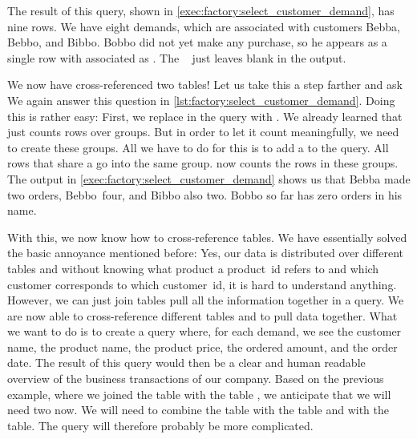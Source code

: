 The result of this query, shown in \cref{exec:factory:select_customer_demand}, has nine rows.
We have eight demands, which are associated with customers Bebba, Bebbo, and Bibbo.
Bobbo did not yet make any purchase, so he appears as a single row with  associated as .
The \psql\  just leaves  blank in the output.

We now have cross-referenced two tables!
Let us take this a step farther and ask 
We again answer this question in \cref{lst:factory:select_customer_demand}.
Doing this is rather easy:
First, we replace  in the query with .
We already learned that  just counts rows over groups.
But in order to let it count meaningfully, we need to create these groups.
All we have to do for this is to add a  to the query.
All rows that share a  go into the same group.
 now counts the rows in these groups.
The output in \cref{exec:factory:select_customer_demand} shows us that Bebba made two orders, Bebbo~four, and Bibbo also two.
Bobbo so far has zero orders in his name.

With this, we now know how to cross-reference tables.
We have essentially solved the basic annoyance mentioned before:
Yes, our data is distributed over different tables and without knowing what product a product~id refers to and which customer corresponds to which customer~id, it is hard to understand anything.
However, we can just join tables pull all the information together in a query.%
%
\FloatBarrier%
\endhsection%
%
%
%
%
We are now able to cross-reference different tables and to pull data together.
What we want to do is to create a query where, for each demand, we see the customer name, the product name, the product price, the ordered amount, and the order date.
The result of this query would then be a clear and human readable overview of the business transactions of our company.
Based on the previous example, where we joined the table  with the table , we anticipate that we will need two  now.
We will need to combine the  table with the  table and with the  table.
The query will therefore probably be more complicated.

